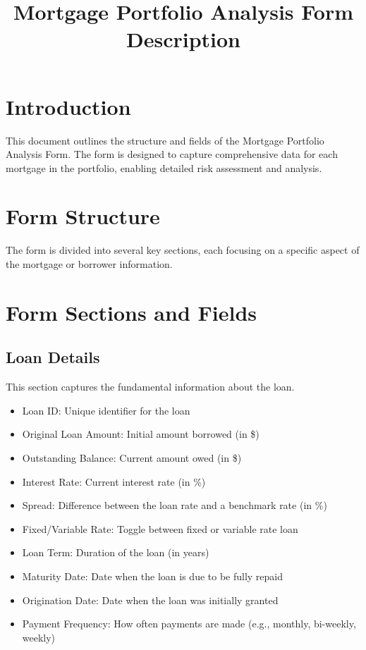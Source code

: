 \documentclass[12pt,a4paper]{article}
\begin{document}
\title{Mortgage Portfolio Analysis Form Description}
\author{}
\date{}

\maketitle

\tableofcontents
\newpage

\section{Introduction}
This document outlines the structure and fields of the Mortgage Portfolio Analysis Form. The form is designed to capture comprehensive data for each mortgage in the portfolio, enabling detailed risk assessment and analysis.

\section{Form Structure}
The form is divided into several key sections, each focusing on a specific aspect of the mortgage or borrower information.

\section{Form Sections and Fields}

\subsection{Loan Details}
This section captures the fundamental information about the loan.

\begin{itemize}
  \item Loan ID: Unique identifier for the loan
  \item Original Loan Amount: Initial amount borrowed (in \$)
  \item Outstanding Balance: Current amount owed (in \$)
  \item Interest Rate: Current interest rate (in \%)
  \item Spread: Difference between the loan rate and a benchmark rate (in \%)
  \item Fixed/Variable Rate: Toggle between fixed or variable rate loan
  \item Loan Term: Duration of the loan (in years)
  \item Maturity Date: Date when the loan is due to be fully repaid
  \item Origination Date: Date when the loan was initially granted
  \item Payment Frequency: How often payments are made (e.g., monthly, bi-weekly, weekly)
\end{itemize}
\end{document}
